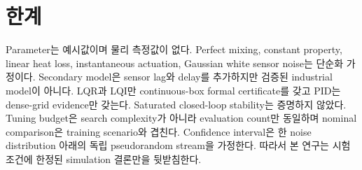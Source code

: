 \section{한계}
Parameter는 예시값이며 물리 측정값이 없다. Perfect mixing, constant property, linear heat loss, instantaneous actuation, Gaussian white sensor noise는 단순화 가정이다. Secondary model은 sensor lag와 delay를 추가하지만 검증된 industrial model이 아니다. LQR과 LQI만 continuous-box formal certificate를 갖고 PID는 dense-grid evidence만 갖는다. Saturated closed-loop stability는 증명하지 않았다. Tuning budget은 search complexity가 아니라 evaluation count만 동일하며 nominal comparison은 training scenario와 겹친다. Confidence interval은 한 noise distribution 아래의 독립 pseudorandom stream을 가정한다. 따라서 본 연구는 시험 조건에 한정된 simulation 결론만을 뒷받침한다.
